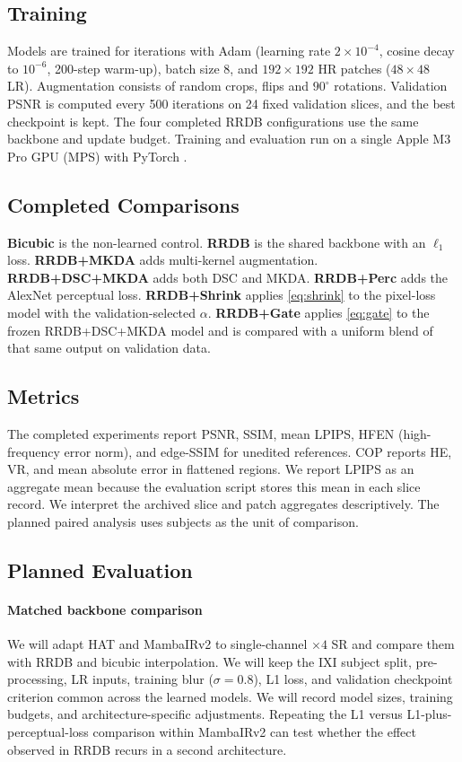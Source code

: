 \documentclass[journal]{IEEEtran}
\begin{document}
\subsection{Training}
Models are trained for \numSteps{} iterations with Adam \cite{kingma2015adam} (learning rate $2\times10^{-4}$, cosine decay to $10^{-6}$, 200-step warm-up), batch size 8, and $192\times192$ HR patches ($48\times48$ LR). Augmentation consists of random crops, flips and $90^\circ$ rotations. Validation PSNR is computed every 500 iterations on 24 fixed validation slices, and the best checkpoint is kept. The four completed RRDB configurations use the same backbone and update budget. Training and evaluation run on a single Apple M3 Pro GPU (MPS) with PyTorch \numTorchVersion{}.

\subsection{Completed Comparisons}
\textbf{Bicubic} is the non-learned control. \textbf{RRDB} is the shared backbone with an $\ell_1$ loss. \textbf{RRDB+MKDA} adds multi-kernel augmentation. \textbf{RRDB+DSC+MKDA} adds both DSC and MKDA. \textbf{RRDB+Perc} adds the AlexNet perceptual loss. \textbf{RRDB+Shrink} applies \eqref{eq:shrink} to the pixel-loss model with the validation-selected $\alpha$. \textbf{RRDB+Gate} applies \eqref{eq:gate} to the frozen RRDB+DSC+MKDA model and is compared with a uniform blend of that same output on validation data.

\subsection{Metrics}
The completed experiments report PSNR, SSIM, mean LPIPS, HFEN (high-frequency error norm), and edge-SSIM for unedited references. COP reports HE, VR, and mean absolute error in flattened regions. We report LPIPS as an aggregate mean because the evaluation script stores this mean in each slice record. We interpret the archived slice and patch aggregates descriptively. The planned paired analysis uses subjects as the unit of comparison.

\subsection{Planned Evaluation}
\label{sec:planned}
\paragraph{Matched backbone comparison}
We will adapt HAT and MambaIRv2 to single-channel $\times4$ SR and compare them with RRDB and bicubic interpolation. We will keep the IXI subject split, pre-processing, LR inputs, training blur ($\sigma=0.8$), L1 loss, and validation checkpoint criterion common across the learned models. We will record model sizes, training budgets, and architecture-specific adjustments. Repeating the L1 versus L1-plus-perceptual-loss comparison within MambaIRv2 can test whether the effect observed in RRDB recurs in a second architecture.
\end{document}
